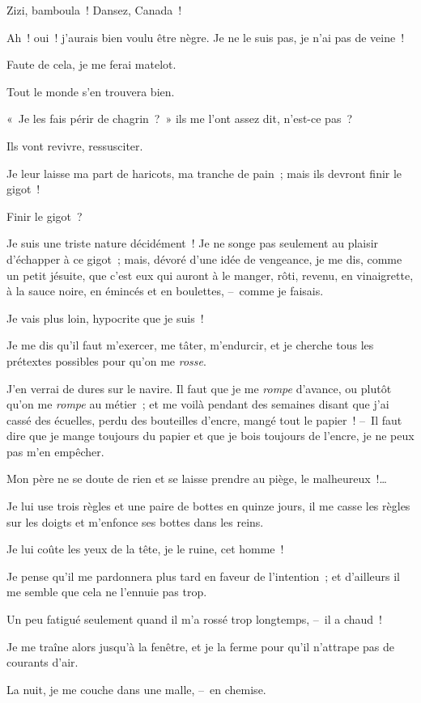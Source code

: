 \documentclass[french,twoside]{book} %
\begin{document}
Zizi, bamboula ! Dansez, Canada !\par
Ah ! oui ! j’aurais bien voulu être nègre. Je ne le suis pas, je n’ai pas de veine !\par
Faute de cela, je me ferai matelot.\par
Tout le monde s’en trouvera bien.\par
« Je les fais périr de chagrin ? » ils me l’ont assez dit, n’est-ce pas ?\par
Ils vont revivre, ressusciter.\par
Je leur laisse ma part de haricots, ma tranche de pain ; mais ils devront finir le gigot !\par
Finir le gigot ?\par
Je suis une triste nature décidément ! Je ne songe pas seulement au plaisir d’échapper à ce gigot ; mais, dévoré d’une idée de vengeance, je me dis, comme un petit jésuite, que c’est eux qui auront à le manger, rôti, revenu, en vinaigrette, à la sauce noire, en émincés et en boulettes, – comme je faisais.\par
\bigbreak
\noindent Je vais plus loin, hypocrite que je suis !\par
Je me dis qu’il faut m’exercer, me tâter, m’endurcir, et je cherche tous les prétextes possibles pour qu’on me \emph{rosse}.\par
J’en verrai de dures sur le navire. Il faut que je me \emph{rompe} d’avance, ou plutôt qu’on me \emph{rompe} au métier ; et me voilà pendant des semaines disant que j’ai cassé des écuelles, perdu des bouteilles d’encre, mangé tout le papier ! – Il faut dire que je mange toujours du papier et que je bois toujours de l’encre, je ne peux pas m’en empêcher.\par
Mon père ne se doute de rien et se laisse prendre au piège, le malheureux !…\par
Je lui use trois règles et une paire de bottes en quinze jours, il me casse les règles sur les doigts et m’enfonce ses bottes dans les reins.\par
Je lui coûte les yeux de la tête, je le ruine, cet homme !\par
Je pense qu’il me pardonnera plus tard en faveur de l’intention ; et d’ailleurs il me semble que cela ne l’ennuie pas trop.\par
Un peu fatigué seulement quand il m’a rossé trop longtemps, – il a chaud !\par
Je me traîne alors jusqu’à la fenêtre, et je la ferme pour qu’il n’attrape pas de courants d’air.\par
La nuit, je me couche dans une malle, – en chemise.\par
\end{document}
